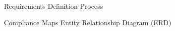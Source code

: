 \begin{figure}[t!] 
\centering
\caption{Requirements Definition Process}
\label{fig:Fig4}
\end{figure}

\begin{figure}[h!] 
\centering
\caption{Compliance Maps Entity Relationship Diagram (ERD)}
\label{fig:Fig5}
\end{figure}

\cleardoublepage

